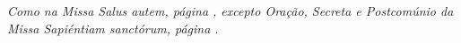 
\textit{Como na Missa Salus autem, página \pageref{muitosmartires3}, excepto Oração, Secreta e Postcomúnio da Missa Sapiéntiam sanctórum, página \pageref{muitosmartires2}.}